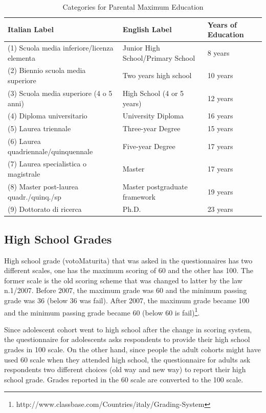 \begin{table}[H]
\caption{Categories for Parental Maximum Education} \label{tab:par-maxedu}
\begin{center}
\begin{tabular}{L{4.3cm} L{4.3cm} L{4.3cm}}
\toprule
\textbf{Italian Label} & \textbf{English Label} & \textbf{Years of Education} \\ \midrule
	(1) Scuola media inferiore/licenza elementa &	Junior High School/Primary School		& 8 years \\
	(2) Biennio scuola media superiore & 				Two years high school								& 10 years \\
	(3) Scuola media superiore (4 o 5 anni) & 		High School (4 or 5 years)								& 12 years \\
	(4) Diploma universitario &	University Diploma & 16 years \\
	(5) Laurea triennale &	Three-year Degree &	15 years \\
	(6) Laurea quadriennale/quinquennale &   	Five-year Degree & 17 years \\
	(7) Laurea specialistica o magistrale & 			Master & 17 years \\
	(8) Master post-laurea quadr./quinq./sp  & Master postgraduate framework			& 19 years \\
	(9) Dottorato di ricerca 	& Ph.D.	& 23 years \\ \bottomrule
\end{tabular}
\end{center}
\end{table}

\subsection{High School Grades}
High school grade (votoMaturita) that was asked in the questionnaires has two different scales, one has the maximum scoring of 60 and the other has 100. The former scale is the old scoring scheme that was changed to latter by the law n.1/2007. Before 2007, the maximum grade was 60 and the minimum passing grade was 36 (below 36 was fail). After 2007, the maximum grade became 100 and the minimum passing grade became 60 (below 60 is fail)\footnote{http://www.classbase.com/Countries/italy/Grading-System}.

Since adolescent cohort went to high school after the change in scoring system, the questionnaire for adolescents asks respondents to provide their high school grades in 100 scale. On the other hand, since people the adult cohorts might have used 60 scale when they attended high school, the questionnaire for adults ask respondents two different choices (old way and new way) to report their high school grade. Grades reported in the 60 scale are converted to the 100 scale. 

